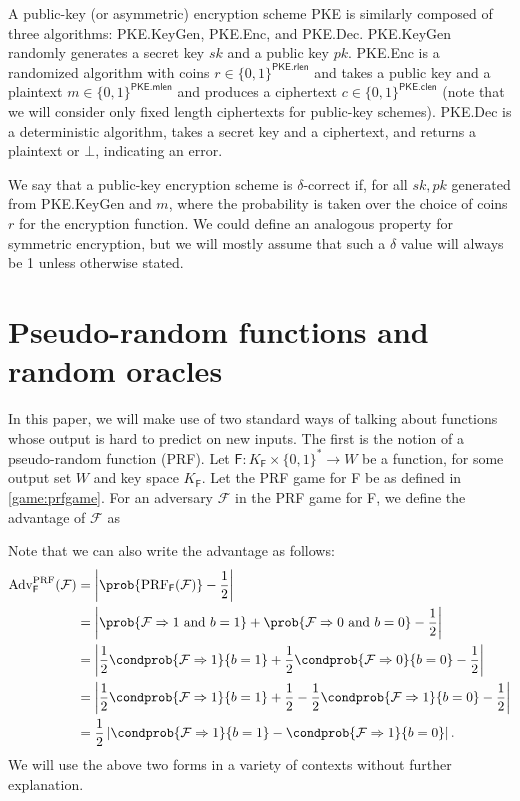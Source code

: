 A public-key (or asymmetric) encryption scheme \textsf{PKE} is similarly composed of three algorithms: \textsf{PKE.KeyGen}, \textsf{PKE.Enc}, and \textsf{PKE.Dec}. \textsf{PKE.KeyGen} randomly generates a secret key $sk$ and a public key $pk$. \textsf{PKE.Enc} is a randomized algorithm with coins $r\in \{0,1\}^\mathsf{PKE.rlen}$ and takes a public key and a plaintext $m\in \{0,1\}^\mathsf{PKE.mlen}$ and produces a ciphertext $c\in \{0,1\}^\mathsf{PKE.clen}$ (note that we will consider only fixed length ciphertexts for public-key schemes). \textsf{PKE.Dec} is a deterministic algorithm, takes a secret key and a ciphertext, and returns a plaintext or $\bot$, indicating an error.

We say that a public-key encryption scheme is $\delta$-correct if, for all $sk,pk$ generated from \textsf{PKE.KeyGen} and $m$,
where the probability is taken over the choice of coins $r$ for the encryption function. We could define an analogous property for symmetric encryption, but we will mostly assume that such a $\delta$ value will always be 1 unless otherwise stated.

\section{Pseudo-random functions and random oracles}
In this paper, we will make use of two standard ways of talking about functions whose output is hard to predict on new inputs. The first is the notion of a pseudo-random function (PRF). Let $\mathsf{F}:K_\mathsf{F}\times \{0,1\}^* \rightarrow W$ be a function, for some output set $W$ and key space $K_\mathsf{F}$. Let the PRF game for \textsf{F} be as defined in \autoref{game:prfgame}. For an adversary $\mathcal{F}$ in the PRF game for \textsf{F}, we define the advantage of $\mathcal{F}$ as

\iffullversion
Note that we can also write the advantage as follows:
\begin{align*}
\text{Adv}^\mathrm{PRF}_\mathsf{F}(\mathcal{F})&=\left\lvert \prob{\text{PRF}_\mathsf{F}(\mathcal{F})}-\frac{1}{2} \right\rvert \\
&=\left\lvert \prob{\mathcal{F}\Rightarrow 1 \text{ and } b=1} + \prob{\mathcal{F}\Rightarrow 0 \text{ and } b=0} -\frac{1}{2} \right\rvert \\
&=\left\lvert \frac{1}{2}\condprob{\mathcal{F}\Rightarrow 1}{b=1} + \frac{1}{2}\condprob{\mathcal{F}\Rightarrow 0}{b=0} -\frac{1}{2} \right\rvert \\
&=\left\lvert \frac{1}{2}\condprob{\mathcal{F}\Rightarrow 1}{b=1} + \frac{1}{2} - \frac{1}{2}\condprob{\mathcal{F}\Rightarrow 1}{b=0} -\frac{1}{2} \right\rvert \\
&=\frac{1}{2} \left\lvert \condprob{\mathcal{F}\Rightarrow 1}{b=1} - \condprob{\mathcal{F}\Rightarrow 1}{b=0} \right\rvert. \\
\end{align*}
We will use the above two forms in a variety of contexts without further explanation.
\fi

